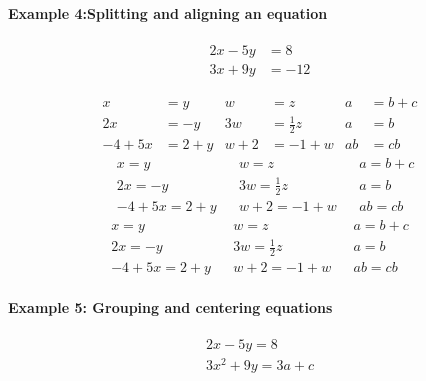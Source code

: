 \documentclass[10pt,a4paper]{article}
\begin{document}
\newpage
\paragraph{Example 4:Splitting and aligning an equation}
\begin{align*} 
2x - 5y &=  8 \\ 
3x + 9y &=  -12
\end{align*}

\begin{align*}
x&=y           &  w &=z              &  a&=b+c\\
2x&=-y         &  3w&=\frac{1}{2}z   &  a&=b\\
-4 + 5x&=2+y   &  w+2&=-1+w          &  ab&=cb
\end{align*}
\begin{align*}
&x=y           &&  w =z              &&  a=b+c\\
&2x=-y         &&  3w=\frac{1}{2}z   &&  a=b\\
&-4 + 5x=2+y   &&  w+2=-1+w          &&  ab=cb
\end{align*}
\begin{align*}
x=y           &&  w =z              &&  a=b+c\\
2x=-y         &&  3w=\frac{1}{2}z   &&  a=b\\
-4 + 5x=2+y   &&  w+2=-1+w          &&  ab=cb
\end{align*}


\paragraph{Example 5: Grouping and centering equations}
\begin{gather*} 
2x - 5y =  8 \\ 
3x^2 + 9y =  3a + c
\end{gather*}
\end{document}
